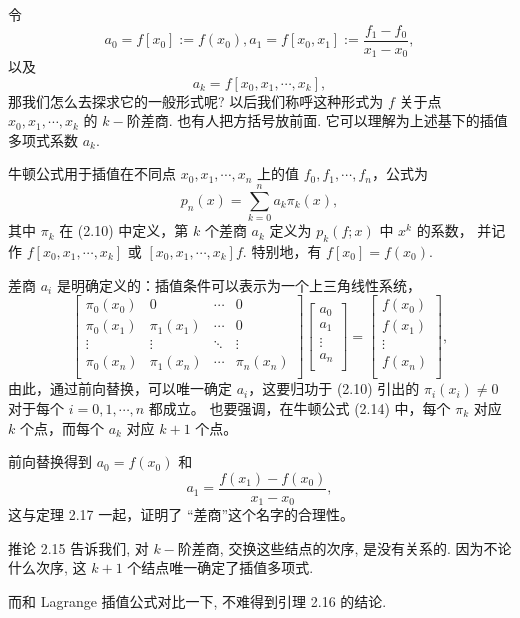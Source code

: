 \documentclass[a4paper]{ctexart}
\begin{document}
令
$$
a_0 = f[x_0] := f(x_0), a_1 = f[x_0, x_1] := \frac{f_1 - f_0}{x_1 - x_0},
$$
以及
$$
a_k = f[x_0, x_1, \cdots, x_k],
$$
那我们怎么去探求它的一般形式呢? 以后我们称呼这种形式为 $f$ 关于点 $x_0, x_1, \cdots, x_k$
的 $k-$阶差商. 也有人把方括号放前面. 它可以理解为上述基下的插值多项式系数 $a_k$.

 牛顿公式用于插值在不同点 
$x_0, x_1, \cdots , x_n$ 上的值 $f_0 , f_1 , \cdots , f_n$，公式为
\[
p_n(x) = \sum_{k=0}^{n} a_k \pi_k(x), \tag{2.14}
\]
其中 $\pi_k$ 在 (2.10) 中定义，第 $k$ 个差商 $a_k$ 定义为 $p_k (f ; x)$ 中 $x^k$ 的系数，
并记作 $f [x_0 , x_1 , \cdots , x_k ]$ 或 $[x_0 , x_1 , \cdots , x_k ]f$.
特别地，有 $f [x_0 ] = f (x_0)$.

 差商 $a_i$ 是明确定义的：插值条件可以表示为一个上三角线性系统，
\[
\begin{bmatrix}
 \pi_0(x_0) & 0 & \cdots & 0 \\
 \pi_0(x_1) & \pi_1(x_1) & \cdots & 0 \\
 \vdots & \vdots & \ddots & \vdots \\
 \pi_0(x_n) & \pi_1(x_n) & \cdots & \pi_n(x_n) \\
\end{bmatrix} \begin{bmatrix}
 a_0 \\
 a_1 \\
 \vdots \\
 a_n \\
\end{bmatrix} = \begin{bmatrix}
 f (x_0) \\
 f (x_1) \\
 \vdots \\
 f (x_n) \\
\end{bmatrix},
\]
由此，通过前向替换，可以唯一确定 $a_i$，这要归功于 (2.10) 
引出的 $\pi_i(x_i) \neq 0$ 对于每个 $i = 0, 1, \cdots , n$ 都成立。
也要强调，在牛顿公式 (2.14) 中，每个 $\pi_k$ 对应 $k$ 个点，而每个 $a_k$ 对应 $k + 1$ 个点。

前向替换得到 $a_0 = f (x_0 )$ 和
\[
a_1 = \frac{f (x_1) - f (x_0)}{x_1 - x_0},
\]
这与定理 2.17 一起，证明了 ``差商''这个名字的合理性。

推论 2.15 告诉我们, 对 $k-$阶差商, 交换这些结点的次序, 是没有关系的. 因为不论什么次序,
这 $k + 1$ 个结点唯一确定了插值多项式.

而和 Lagrange 插值公式对比一下, 不难得到引理 2.16 的结论.
\end{document}
